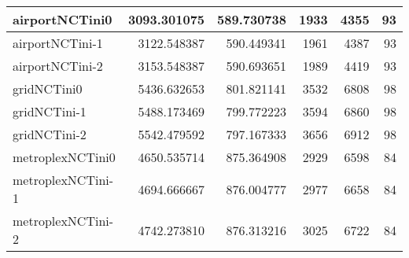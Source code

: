 \documentclass[../../../thesis.tex]{subfiles}
\begin{document}
\begin{longtable}{|l|r|r|r|r|r|}
airportNCTini0 & 3093.301075 & 589.730738 & 1933 & 4355 & 93 \\ \hline
airportNCTini-1 & 3122.548387 & 590.449341 & 1961 & 4387 & 93 \\ \hline
airportNCTini-2 & 3153.548387 & 590.693651 & 1989 & 4419 & 93 \\ \hline
gridNCTini0 & 5436.632653 & 801.821141 & 3532 & 6808 & 98 \\ \hline
gridNCTini-1 & 5488.173469 & 799.772223 & 3594 & 6860 & 98 \\ \hline
gridNCTini-2 & 5542.479592 & 797.167333 & 3656 & 6912 & 98 \\ \hline
metroplexNCTini0 & 4650.535714 & 875.364908 & 2929 & 6598 & 84 \\ \hline
metroplexNCTini-1 & 4694.666667 & 876.004777 & 2977 & 6658 & 84 \\ \hline
metroplexNCTini-2 & 4742.273810 & 876.313216 & 3025 & 6722 & 84 \\ \hline
\end{longtable}
\fi
\end{document}
